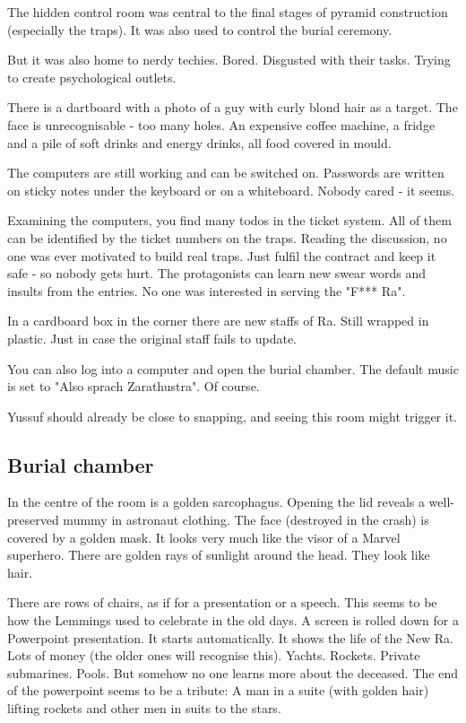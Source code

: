 The hidden control room was central to the final stages of pyramid construction (especially the traps). It was also used to control the burial ceremony.

But it was also home to nerdy techies. Bored. Disgusted with their tasks. Trying to create psychological outlets.

There is a dartboard with a photo of a guy with curly blond hair as a target. The face is unrecognisable - too many holes.
An expensive coffee machine, a fridge and a pile of soft drinks and energy drinks, all food covered in mould.

The computers are still working and can be switched on. Passwords are written on sticky notes under the keyboard or on a whiteboard. Nobody cared - it seems.

Examining the computers, you find many todos in the ticket system. All of them can be identified by the ticket numbers on the traps. Reading the discussion, no one was ever motivated to build real traps. Just fulfil the contract and keep it safe - so nobody gets hurt.
The protagonists can learn new swear words and insults from the entries. No one was interested in serving the "F*** Ra".

In a cardboard box in the corner there are new staffs of Ra. Still wrapped in plastic. Just in case the original staff fails to update.

You can also log into a computer and open the burial chamber. The default music is set to "Also sprach Zarathustra". Of course.

Yussuf should already be close to snapping, and seeing this room might trigger it.

\subsection{Burial chamber}

In the centre of the room is a golden sarcophagus. Opening the lid reveals a well-preserved mummy in astronaut clothing. The face (destroyed in the crash) is covered by a golden mask. It looks very much like the visor of a Marvel superhero. There are golden rays of sunlight around the head. They look like hair.

There are rows of chairs, as if for a presentation or a speech. This seems to be how the Lemmings used to celebrate in the old days. A screen is rolled down for a Powerpoint presentation. It starts automatically.
It shows the life of the New Ra. Lots of money (the older ones will recognise this). Yachts. Rockets. Private submarines. Pools. But somehow no one learns more about the deceased.
The end of the powerpoint seems to be a tribute: A man in a suite (with golden hair) lifting rockets and other men in suits to the stars.

